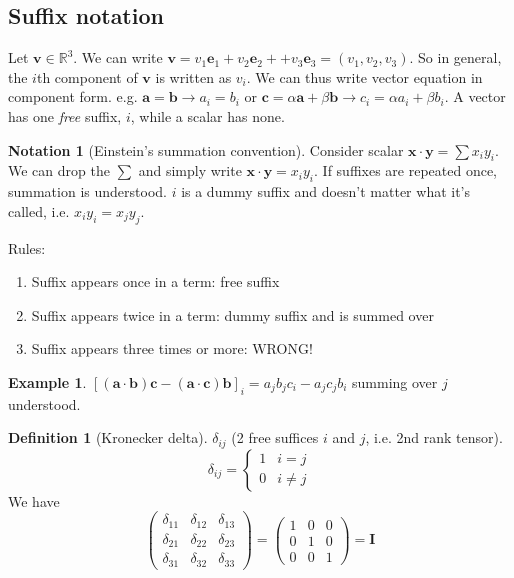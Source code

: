 \documentclass[a4paper]{article}
\theoremstyle{definition}
\newtheorem*{defi}{Definition}
\newtheorem*{eg}{Example}
\newtheorem*{notation}{Notation}
\newcommand{\mb}[1]{\mathbf{#1}}
\newcommand{\R}{\mathbb{R}}
\begin{document}
\subsection{Suffix notation}
Let $\mb{v}\in \R^3$. We can write $\mb{v} = v_1\mb{e}_1 + v_2\mb{e}_2 +  + v_3\mb{e}_3 = (v_1, v_2, v_3)$. So in general, the $i$th component of $\mb{v}$ is written as $v_i$. We can thus write vector equation in component form. e.g. $\mb{a = b} \rightarrow a_i = b_i$ or $\mb{c}=\alpha\mb{a} + \beta\mb{b} \rightarrow c_i = \alpha a_i + \beta b_i$. A vector has one \emph{free} suffix, $i$, while a scalar has none.

\begin{notation}[Einstein's summation convention]
  Consider scalar $\mb{x\cdot y} = \sum x_iy_i$. We can drop the $\sum$ and simply write $\mb{x\cdot y} = x_iy_i$. If suffixes are repeated once, summation is understood. $i$ is a dummy suffix and doesn't matter what it's called, i.e. $x_iy_i = x_jy_j$.

  Rules:
  \begin{enumerate}
  \item Suffix appears once in a term: free suffix
  \item Suffix appears twice in a term: dummy suffix and is summed over
  \item Suffix appears three times or more: WRONG!
  \end{enumerate}
\end{notation}

\begin{eg}
  $[\mb{(a\cdot b)c - (a \cdot c)b}]_i = a_jb_jc_i - a_jc_jb_i$ summing over $j$ understood.
\end{eg}

\begin{defi}[Kronecker delta]
  $\delta_{ij}$ (2 free suffices $i$ and $j$, i.e. 2nd rank tensor).
  \[
  \delta_{ij} = 
  \begin{cases}
    1 & i = j\\
    0 & i\not=j
  \end{cases}
  \]
  We have
  \[
  \begin{pmatrix}
    \delta_{11} & \delta_{12} & \delta_{13}\\
    \delta_{21} & \delta_{22} & \delta_{23}\\
    \delta_{31} & \delta_{32} & \delta_{33}
  \end{pmatrix} =
  \begin{pmatrix}
    1 & 0 & 0\\
    0 & 1 & 0\\
    0 & 0 & 1
  \end{pmatrix}
   = \mb{I}
   \]
\end{defi}
\end{document}
